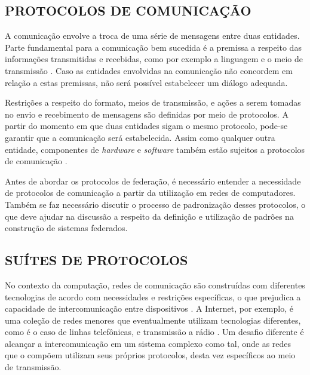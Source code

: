 \begin{apendicesenv}

\partapendices

\chapter{PROTOCOLOS DE COMUNICAÇÃO}

A comunicação envolve a troca de uma série de mensagens entre duas entidades. Parte
fundamental para a comunicação bem sucedida é a premissa a respeito das informações
transmitidas e recebidas, como por exemplo a linguagem e o meio de transmissão
\cite{comer2000}. Caso as entidades envolvidas na comunicação não concordem em
relação a estas premissas, não será possível estabelecer um diálogo adequada.

Restrições a respeito do formato, meios de transmissão, e ações a serem tomadas no
envio e recebimento de mensagens são definidas por meio de protocolos. A partir do
momento em que duas entidades sigam o mesmo protocolo, pode-se garantir que a
comunicação será estabelecida. Assim como qualquer outra entidade, componentes de
\textit{hardware} e \textit{software} também estão sujeitos a protocolos de
comunicação \cite{kurose2012}.

Antes de abordar os protocolos de federação, é necessário entender a necessidade de
protocolos de comunicação a partir da utilização em redes de computadores. Também se
faz necessário discutir o processo de padronização desses protocolos, o que deve
ajudar na discussão a respeito da definição e utilização de padrões na construção de
sistemas federados.



\section{SUÍTES DE PROTOCOLOS}

No contexto da computação, redes de comunicação são construídas com diferentes
tecnologias de acordo com necessidades e restrições específicas, o que prejudica a
capacidade de intercomunicação entre dispositivos \cite{comer2000}. A Internet, por
exemplo, é uma coleção de redes menores que eventualmente utilizam tecnologias
diferentes, como é o caso de linhas telefônicas, e transmissão a rádio
\cite{tanenbaum2010}. Um desafio diferente é alcançar a intercomunicação em um
sistema complexo como tal, onde as redes que o compõem utilizam seus próprios
protocolos, desta vez específicos ao meio de transmissão.


\end{apendicesenv}

